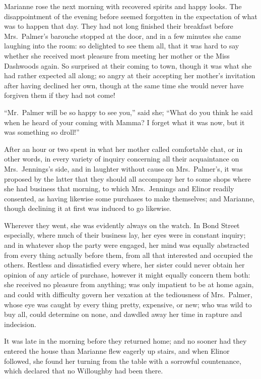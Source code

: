 \documentclass{article}
\begin{document}
Marianne rose the next morning with recovered spirits
and happy looks.  The disappointment of the evening before
seemed forgotten in the expectation of what was to happen
that day.  They had not long finished their breakfast before
Mrs.\ Palmer's barouche stopped at the door, and in a few
minutes she came laughing into the room: so delighted
to see them all, that it was hard to say whether she
received most pleasure from meeting her mother or the Miss
Dashwoods again.  So surprised at their coming to town,
though it was what she had rather expected all along;
so angry at their accepting her mother's invitation
after having declined her own, though at the same time
she would never have forgiven them if they had not come!

``Mr.\ Palmer will be so happy to see you,''
said she; ``What do you think he said when he heard
of your coming with Mamma?  I forget what it was now,
but it was something so droll!''

After an hour or two spent in what her mother called
comfortable chat, or in other words, in every variety of inquiry
concerning all their acquaintance on Mrs.\ Jennings's side,
and in laughter without cause on Mrs.\ Palmer's, it was
proposed by the latter that they should all accompany
her to some shops where she had business that morning,
to which Mrs.\ Jennings and Elinor readily consented,
as having likewise some purchases to make themselves;
and Marianne, though declining it at first was induced
to go likewise.

Wherever they went, she was evidently always on
the watch.  In Bond Street especially, where much of
their business lay, her eyes were in constant inquiry;
and in whatever shop the party were engaged, her mind was
equally abstracted from every thing actually before them,
from all that interested and occupied the others.
Restless and dissatisfied every where, her sister could
never obtain her opinion of any article of purchase,
however it might equally concern them both: she received
no pleasure from anything; was only impatient to be at
home again, and could with difficulty govern her vexation
at the tediousness of Mrs.\ Palmer, whose eye was caught
by every thing pretty, expensive, or new; who was wild
to buy all, could determine on none, and dawdled away her
time in rapture and indecision.

It was late in the morning before they returned home;
and no sooner had they entered the house than Marianne flew
eagerly up stairs, and when Elinor followed, she found
her turning from the table with a sorrowful countenance,
which declared that no Willoughby had been there.
\end{document}
